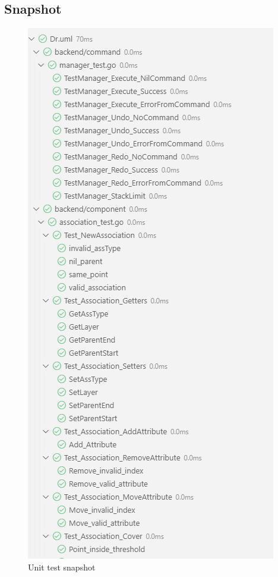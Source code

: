 \documentclass[12pt]{article}
\begin{document}
    \subsection{Snapshot}

    \begin{figure}[H]
        \begin{center}
            \includegraphics[width=0.95\linewidth]
            {assets/hw7/cover1.png}
            \caption{Unit test snapshot}
        \end{center}
    \end{figure}
\end{document}
